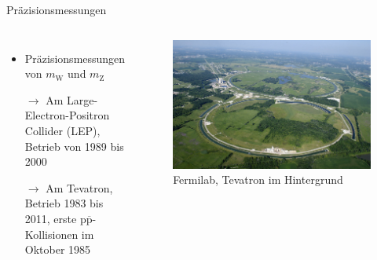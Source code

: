 \documentclass[aspectratio=1610, professionalfonts, 10pt]{beamer}
\begin{document}
\begin{frame}{Präzisionsmessungen}
	\begin{columns}
				\begin{itemize}
					\setlength\itemsep{0.5em}
					\vspace*{-20px}
					\item Präzisionsmessungen von $m_\text{W}$ und $m_\text{Z}$
					\item[$\rightarrow$] Am Large-Electron-Positron Collider (LEP), Betrieb von 1989 bis 2000
					\item[$\rightarrow$] Am Tevatron, Betrieb 1983 bis 2011, erste $\text{p}\overline{\text{p}}$-Kollisionen im Oktober 1985
				\end{itemize}
			\begin{figure}
	  			\centering
				\includegraphics[width=\linewidth]{Images/1200px-Fermilab.jpg}
				\caption{Fermilab, Tevatron im Hintergrund \cite{wiki:tevatron}}
	  			\label{fig:sad}
			\end{figure}
	\end{columns}
\end{frame}
\end{document}
